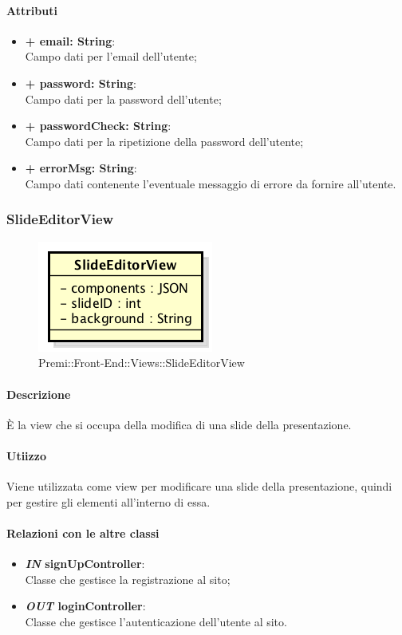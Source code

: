 	\paragraph{Attributi}
	\begin{itemize}
		\item \textbf{+ email: String}:\\
		Campo dati per l'email dell'utente;
		\item \textbf{+ password: String}:\\
		Campo dati per la password dell'utente;
		\item \textbf{+ passwordCheck: String}:\\
		Campo dati per la ripetizione della password dell'utente;
		\item \textbf{+ errorMsg: String}:\\
		Campo dati contenente l'eventuale messaggio di errore da fornire all'utente.
	\end{itemize}
	
	
\subsubsection{SlideEditorView}
	\begin{figure}[h]
		\centering
		\includegraphics[width=0.4\linewidth]{img/premi_front_end_views_slideeditorview}
		\caption[Premi::Front-End::Views::SlideEditorView]{Premi::Front-End::Views::SlideEditorView}
	\end{figure}
	
	\paragraph{Descrizione}
	È la view che si occupa della modifica di una slide della presentazione.
	
	\paragraph{Utiizzo}
	Viene utilizzata come view per modificare una slide della presentazione, quindi per gestire gli elementi all'interno di essa.
	
	\paragraph{Relazioni con le altre classi}
	\begin{itemize}
		\item \textbf{\textit{IN} signUpController}:\\
		Classe che gestisce la registrazione al sito;
		\item \textbf{\textit{OUT} loginController}:\\
		Classe che gestisce l'autenticazione dell'utente al sito.
	\end{itemize}
	
